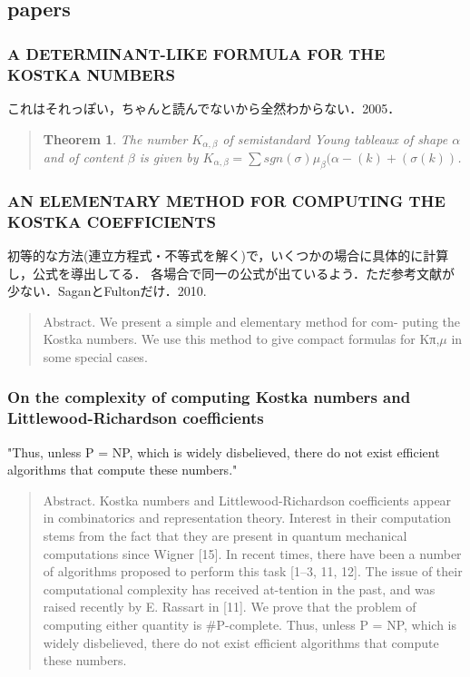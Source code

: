 \documentclass{ujarticle}[12pt,a4pepar]
\theoremstyle{jplain}
\newtheorem*{thm*}{Theorem}
\begin{document}
\subsection{papers}
\subsubsection{A DETERMINANT-LIKE FORMULA FOR THE KOSTKA NUMBERS}
\label{formula}
これはそれっぽい，ちゃんと読んでないから全然わからない．2005．
\begin{quotation}
  \begin{thm*}
    The number $K_{\alpha,\beta}$ of semistandard Young tableaux of shape $\alpha$
    and of content $\beta$ is given by
    $K_{\alpha,\beta} = \sum sgn(\sigma)\mu_{\beta}(\alpha - (k) + (\sigma(k))$.
  \end{thm*}
\end{quotation}

\subsubsection{AN ELEMENTARY METHOD FOR COMPUTING THE KOSTKA COEFFICIENTS}
初等的な方法(連立方程式・不等式を解く)で，いくつかの場合に具体的に計算し，公式を導出してる．
各場合で同一の公式が出ているよう．ただ参考文献が少ない．SaganとFultonだけ．2010.
\begin{quotation}
  Abstract.
  We present a simple and elementary method for com- puting the Kostka numbers.
  We use this method to give compact formulas for Kπ,$\mu$ in some special cases.
\end{quotation}

\subsubsection{On the complexity of computing Kostka numbers and Littlewood-Richardson coefficients}
"Thus, unless P = NP, which is widely disbelieved,
there do not exist efficient algorithms that compute these numbers."
\begin{quotation}
  Abstract.
  Kostka numbers and Littlewood-Richardson coefficients appear in combinatorics and representation theory.
  Interest in their computation stems from the fact that they are present in quantum mechanical computations since Wigner [15].
  In recent times, there have been a number of algorithms proposed to perform this task [1–3, 11, 12].
  The issue of their computational complexity has received at-tention in the past, and was raised recently by E. Rassart in [11].
  We prove that the problem of computing either quantity is \#P-complete. Thus, unless P = NP, which is widely disbelieved,
  there do not exist efficient algorithms that compute these numbers.
\end{quotation}
\end{document}
